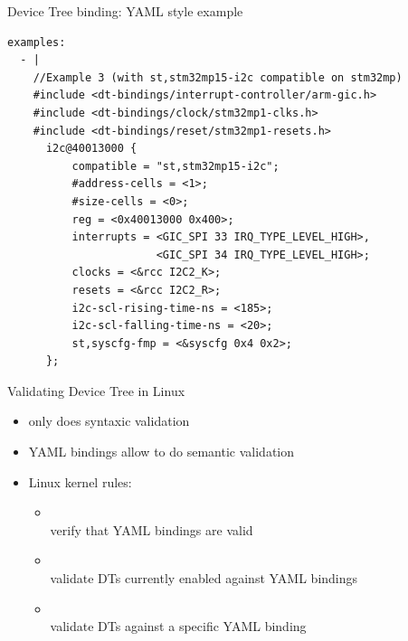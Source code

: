 \begin{frame}[fragile]{Device Tree binding: YAML style example}
    \begin{block}{}
      {\fontsize{5}{6}\selectfont
\begin{verbatim}
examples:
  - |
    //Example 3 (with st,stm32mp15-i2c compatible on stm32mp)
    #include <dt-bindings/interrupt-controller/arm-gic.h>
    #include <dt-bindings/clock/stm32mp1-clks.h>
    #include <dt-bindings/reset/stm32mp1-resets.h>
      i2c@40013000 {
          compatible = "st,stm32mp15-i2c";
          #address-cells = <1>;
          #size-cells = <0>;
          reg = <0x40013000 0x400>;
          interrupts = <GIC_SPI 33 IRQ_TYPE_LEVEL_HIGH>,
                       <GIC_SPI 34 IRQ_TYPE_LEVEL_HIGH>;
          clocks = <&rcc I2C2_K>;
          resets = <&rcc I2C2_R>;
          i2c-scl-rising-time-ns = <185>;
          i2c-scl-falling-time-ns = <20>;
          st,syscfg-fmp = <&syscfg 0x4 0x2>;
      };
\end{verbatim}
      }
    \end{block}
\end{frame}

\begin{frame}{Validating Device Tree in Linux}
  \begin{itemize}
  \item {} only does syntaxic validation
  \item YAML bindings allow to do semantic validation
  \item Linux kernel  rules:
    \begin{itemize}
    \item {}\\
      verify that YAML bindings are valid
    \item {}\\
      validate DTs currently enabled against YAML bindings
    \item {}\\
      validate DTs against a specific YAML binding
    \end{itemize}
  \end{itemize}
\end{frame}

